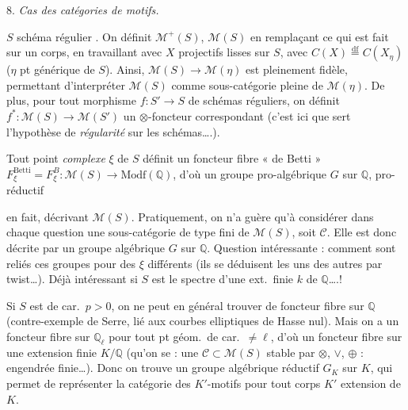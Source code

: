 \documentclass[11pt,a4paper]{article}
\begin{document}
8. \emph{Cas des catégories de motifs.} 

$S$ schéma régulier . On définit $\mathcal{M}^{+}(S)$,
$\mathcal{M}(S)$ en remplaçant ce qui est fait sur un corps, en travaillant
avec $X$ projectifs lisses sur $S$, avec
$C(X) \overset{\mathrm{df}}{=} C(X_{\eta})$ ($\eta$ pt générique de $S$).
Ainsi, $\mathcal{M}(S) \to \mathcal{M}(\eta)$ est pleinement fidèle,
permettant d'interpréter $\mathcal{M}(S)$ comme sous-catégorie pleine de
$\mathcal{M}(\eta)$. De plus, pour tout morphisme $f : S' \to S$ de schémas
réguliers, on définit $f^{*} : \mathcal{M}(S) \to \mathcal{M}(S')$ un
$\otimes$-foncteur correspondant (c'est ici que sert l'hypothèse de
\emph{régularité} sur les schémas….).

Tout point \emph{complexe}  $\xi$ de $S$ définit un foncteur
fibre « de Betti »
$F_{\xi}^{\mathrm{Betti}} = F_{\xi}^{B} : \mathcal{M}(S) \to
\mathrm{Modf}(\mathbb{Q})$, d'où un groupe pro-algébrique $G$ sur
$\mathbb{Q}$, pro-réductif

en fait, \struck{\ill{}} décrivant $\mathcal{M}(S)$. Pratiquement, on n'a guère
qu'à considérer dans  chaque question une sous-catégorie de type
fini de $\mathcal{M}(S)$, soit $\mathcal{C}$. Elle est donc décrite par un
\struck{\ill{}} groupe algébrique  $G$ sur $\mathbb{Q}$.
Question intéressante : comment sont reliés ces groupes pour des $\xi$
différents (ils se déduisent les uns des autres par twist…). Déjà intéressant
si $S$ est le spectre d'une ext.\ finie $k$ de $\mathbb{Q}$….!

Si $S$ est de car.\ $p > 0$, on ne peut en général trouver de foncteur fibre
sur $\mathbb{Q}$ (contre-exemple de Serre, lié aux courbes elliptiques de
Hasse nul). Mais on a un foncteur fibre sur $\mathbb{Q}_{\ell}$ pour tout pt
géom.\ de car.\ $\neq \ell$, d'où un foncteur fibre sur une extension finie
$K/\mathbb{Q}$ (qu'on se  : une
$\mathcal{C} \subset \mathcal{M}(S)$ stable par \struck{\ill{}}
$\otimes$, $\vee$, $\oplus$ : engendrée finie…). Donc on trouve un groupe
algébrique réductif $G_{K}$ sur $K$, qui permet de représenter la catégorie
des $K'$-motifs pour tout corps $K'$  extension de
$K$.

\end{document}
